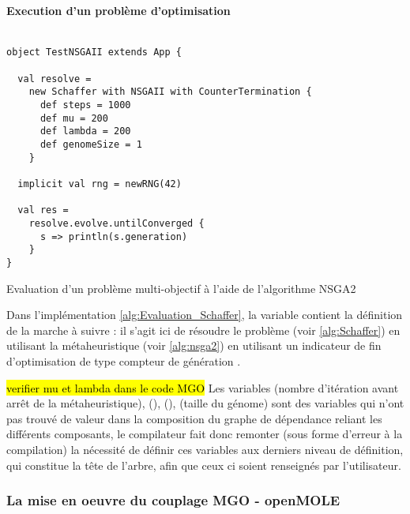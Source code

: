 
\paragraph{Execution d'un problème d'optimisation}

\begin{listing}[H]

\begin{verbatim}

object TestNSGAII extends App {

  val resolve =
    new Schaffer with NSGAII with CounterTermination {
      def steps = 1000
      def mu = 200
      def lambda = 200
      def genomeSize = 1
    }

  implicit val rng = newRNG(42)

  val res =
    resolve.evolve.untilConverged {
      s => println(s.generation)
    }
}

\end{verbatim}
\caption{Evaluation d'un problème multi-objectif à l'aide de l'algorithme NSGA2}
\label{alg:Evaluation_Schaffer}
\end{listing}

Dans l'implémentation \ref{alg:Evaluation_Schaffer}, la variable   contient la définition de la marche à suivre : il s'agit ici de résoudre le problème  (voir \ref{alg:Schaffer}) en utilisant la métaheuristique  (voir \ref{alg:nsga2}) en utilisant un indicateur de fin d'optimisation de type compteur de génération .

\hl{verifier mu et lambda dans le code MGO}
Les variables  (nombre d'itération avant arrêt de la métaheuristique),  (),  (),  (taille du génome) sont des variables qui n'ont pas trouvé de valeur dans la composition du graphe de dépendance reliant les différents composants, le compilateur fait donc remonter (sous forme d'erreur à la compilation) la nécessité de définir ces variables aux derniers niveau de définition, qui constitue la tête de l'arbre, afin que ceux ci soient renseignés par l'utilisateur.


\subsubsection{La mise en oeuvre du couplage MGO - openMOLE }

